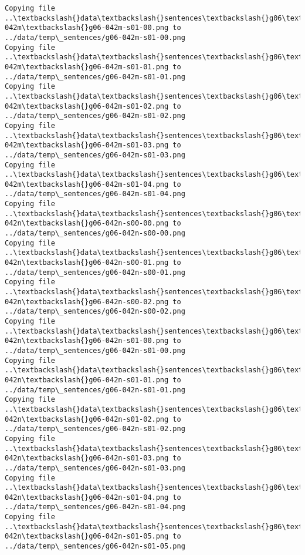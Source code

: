 \documentclass[11pt]{article}
\begin{document}
\begin{Verbatim}[commandchars=\\\{\}]
Copying file ..\textbackslash{}data\textbackslash{}sentences\textbackslash{}g06\textbackslash{}g06-042m\textbackslash{}g06-042m-s01-00.png to
../data/temp\_sentences/g06-042m-s01-00.png
Copying file ..\textbackslash{}data\textbackslash{}sentences\textbackslash{}g06\textbackslash{}g06-042m\textbackslash{}g06-042m-s01-01.png to
../data/temp\_sentences/g06-042m-s01-01.png
Copying file ..\textbackslash{}data\textbackslash{}sentences\textbackslash{}g06\textbackslash{}g06-042m\textbackslash{}g06-042m-s01-02.png to
../data/temp\_sentences/g06-042m-s01-02.png
Copying file ..\textbackslash{}data\textbackslash{}sentences\textbackslash{}g06\textbackslash{}g06-042m\textbackslash{}g06-042m-s01-03.png to
../data/temp\_sentences/g06-042m-s01-03.png
Copying file ..\textbackslash{}data\textbackslash{}sentences\textbackslash{}g06\textbackslash{}g06-042m\textbackslash{}g06-042m-s01-04.png to
../data/temp\_sentences/g06-042m-s01-04.png
Copying file ..\textbackslash{}data\textbackslash{}sentences\textbackslash{}g06\textbackslash{}g06-042n\textbackslash{}g06-042n-s00-00.png to
../data/temp\_sentences/g06-042n-s00-00.png
Copying file ..\textbackslash{}data\textbackslash{}sentences\textbackslash{}g06\textbackslash{}g06-042n\textbackslash{}g06-042n-s00-01.png to
../data/temp\_sentences/g06-042n-s00-01.png
Copying file ..\textbackslash{}data\textbackslash{}sentences\textbackslash{}g06\textbackslash{}g06-042n\textbackslash{}g06-042n-s00-02.png to
../data/temp\_sentences/g06-042n-s00-02.png
Copying file ..\textbackslash{}data\textbackslash{}sentences\textbackslash{}g06\textbackslash{}g06-042n\textbackslash{}g06-042n-s01-00.png to
../data/temp\_sentences/g06-042n-s01-00.png
Copying file ..\textbackslash{}data\textbackslash{}sentences\textbackslash{}g06\textbackslash{}g06-042n\textbackslash{}g06-042n-s01-01.png to
../data/temp\_sentences/g06-042n-s01-01.png
Copying file ..\textbackslash{}data\textbackslash{}sentences\textbackslash{}g06\textbackslash{}g06-042n\textbackslash{}g06-042n-s01-02.png to
../data/temp\_sentences/g06-042n-s01-02.png
Copying file ..\textbackslash{}data\textbackslash{}sentences\textbackslash{}g06\textbackslash{}g06-042n\textbackslash{}g06-042n-s01-03.png to
../data/temp\_sentences/g06-042n-s01-03.png
Copying file ..\textbackslash{}data\textbackslash{}sentences\textbackslash{}g06\textbackslash{}g06-042n\textbackslash{}g06-042n-s01-04.png to
../data/temp\_sentences/g06-042n-s01-04.png
Copying file ..\textbackslash{}data\textbackslash{}sentences\textbackslash{}g06\textbackslash{}g06-042n\textbackslash{}g06-042n-s01-05.png to
../data/temp\_sentences/g06-042n-s01-05.png

\end{Verbatim}
\end{document}
